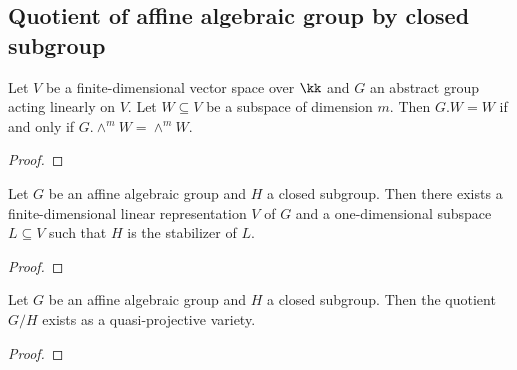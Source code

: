 \subsection{Quotient of affine algebraic group by closed subgroup}

    \begin{lemma}\label{lem:fix_subspace_iff_fix_its_exterior_power}
        Let \(V\) be a finite-dimensional vector space over \(\kk\) and \(G\) an abstract group acting linearly on \(V\).
        Let \(W \subseteq V\) be a subspace of dimension \(m\).
        Then \(G.W = W\) if and only if \(G.\wedge^m W = \wedge^m W\).
    \end{lemma}
    \begin{proof}
    \end{proof}

    \begin{lemma}\label{lem:closed_subgroup_of_affine_algebraic_group_can_be_realized_as_stabilizer_of_line}
        Let \(G\) be an affine algebraic group and \(H\) a closed subgroup.
        Then there exists a finite-dimensional linear representation \(V\) of \(G\) and a one-dimensional subspace \(L \subseteq V\) such that \(H\) is the stabilizer of \(L\).
    \end{lemma}
    \begin{proof}
    \end{proof}

    \begin{theorem}\label{thm:quotient_of_affine_algebraic_group_by_closed_subgroup_by_passage_to_projective_space}
        Let \(G\) be an affine algebraic group and \(H\) a closed subgroup.
        Then the quotient \(G/H\) exists as a quasi-projective variety.
    \end{theorem}
    \begin{proof}
    \end{proof}

